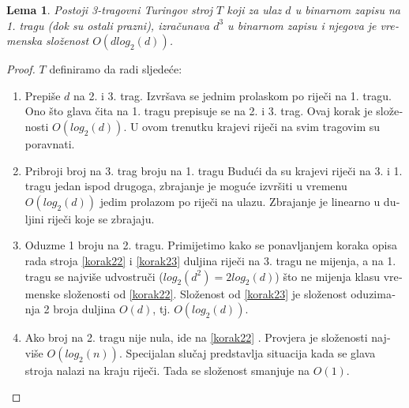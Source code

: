 \documentclass[12pt]{rectors}
\newtheorem{lemma}[theorem]{Lema}
\begin{document}
\begin{otherlanguage}{croatian}
%
%

\begin{lemma}
Postoji 3-tragovni Turingov stroj $T$ 
 koji za ulaz $d$ u binarnom zapisu na 1. tragu (dok su ostali prazni), izračunava
$d^3$ u binarnom zapisu i njegova je vremenska složenost $O(dlog_2(d))$.
\end{lemma}

\begin{proof}

$T$ definiramo da radi sljedeće:
\begin{enumerate}
    \item Prepiše $d$ na 2. i 3. trag\newline.
    Izvršava se jednim prolaskom po riječi na 1. tragu. Ono što glava čita na 1. tragu prepisuje se na 2. i 3. trag. Ovaj korak je složenosti $O(log_2(d))$. U ovom trenutku krajevi riječi na svim tragovim su poravnati.
    \item Pribroji broj na 3. trag broju na 1. tragu 
    \newline
    Budući da su krajevi riječi na 3. i 1. tragu jedan ispod drugoga, zbrajanje je moguće izvršiti u vremenu $O(log_2(d))$ jedim prolazom po riječi na ulazu. 
    Zbrajanje je linearno u duljini riječi koje se zbrajaju.
    \label{korak22}
    \item Oduzme 1 broju na 2. tragu\label{korak23}.\newline
    Primijetimo kako se ponavljanjem koraka opisa rada stroja \ref{korak22} i 
    \ref{korak23} duljina riječi na 3. tragu ne mijenja, a na 1. tragu se najviše udvostruči ($log_2(d^2) = 2log_2(d)$) što ne mijenja klasu vremenske složenosti od \ref{korak22}.
    Složenost od \ref{korak23} je složenost oduzimanja 2 broja duljina $O(d)$, tj. $O(log_2(d))$.

    \item Ako broj na 2. tragu nije nula, ide na \ref{korak22} \label{korak24}.\newline
    Provjera je složenosti najviše $O(log_2(n))$. Specijalan slučaj predstavlja situacija kada se glava stroja nalazi na kraju riječi. Tada se 
    složenost smanjuje na $O(1)$.
    

\end{enumerate}
\end{proof}
\end{otherlanguage}
\end{document}
